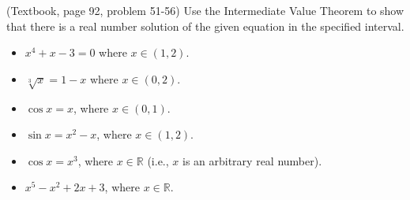 (Textbook, page 92, problem 51-56) Use the Intermediate Value Theorem to show that there is a real number solution of the given equation in the specified interval. 
\begin{multicols}{2}
\begin{itemize}
\item $x^4+x-3=0$ where $x\in (1,2)$.
\item $\sqrt[3]{x}=1-x$ where $x\in (0,2) $.
\item $\cos x=x$, where $x\in (0,1)$.
\item $\sin x=x^2-x$, where $x\in (1,2)$.
\item $\cos x=x^3$, where $x\in \mathbb R$ (i.e., $x$ is an arbitrary real number).
\item $x^5-x^2+2x+3$, where $x\in \mathbb R$.
\end{itemize}
\end{multicols}
